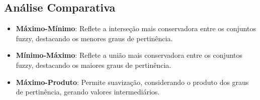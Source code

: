 \documentclass[a4paper,12pt]{article}
\begin{document}
\subsection{Análise Comparativa}

\begin{itemize}
    \item \textbf{Máximo-Mínimo}: Reflete a interseção mais conservadora entre os conjuntos fuzzy, destacando os menores graus de pertinência.
    \item \textbf{Mínimo-Máximo}: Reflete a união mais conservadora entre os conjuntos fuzzy, destacando os maiores graus de pertinência.
    \item \textbf{Máximo-Produto}: Permite suavização, considerando o produto dos graus de pertinência, gerando valores intermediários.
\end{itemize}
\end{document}
